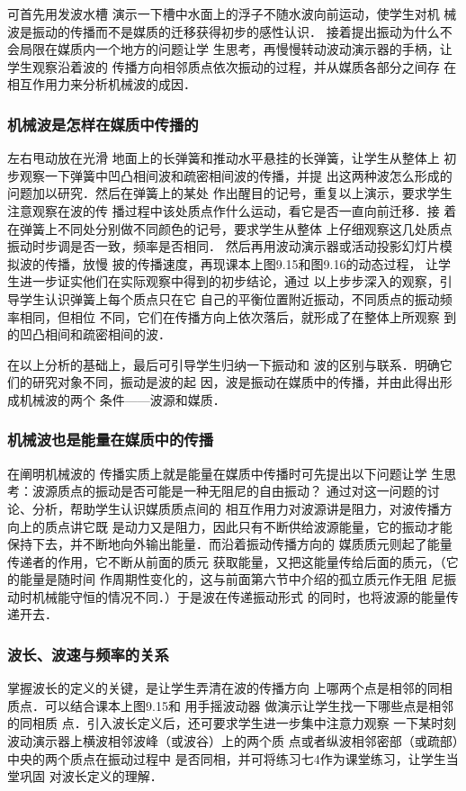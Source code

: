 可首先用发波水槽
演示一下槽中水面上的浮子不随水波向前运动，使学生对机
械波是振动的传播而不是媒质的迁移获得初步的感性认识．
接着提出振动为什么不会局限在媒质内一个地方的问题让学
生思考，再慢慢转动波动演示器的手柄，让学生观察沿着波的
传播方向相邻质点依次振动的过程，并从媒质各部分之间存
在相互作用力来分析机械波的成因．

\subsubsection{机械波是怎样在媒质中传播的}

左右甩动放在光滑
地面上的长弹簧和推动水平悬挂的长弹簧，让学生从整体上
初步观察一下弹簧中凹凸相间波和疏密相间波的传播，并提
出这两种波怎么形成的问题加以研究．然后在弹簧上的某处
作出醒目的记号，重复以上演示，要求学生注意观察在波的传
播过程中该处质点作什么运动，看它是否一直向前迁移．接
着在弹簧上不同处分别做不同颜色的记号，要求学生从整体
上仔细观察这几处质点振动时步调是否一致，频率是否相同．
然后再用波动演示器或活动投影幻灯片模拟波的传播，放慢
披的传播速度，再现课本上图9.15和图9.16的动态过程，
让学生进一步证实他们在实际观察中得到的初步结论，通过
以上步步深入的观察，引导学生认识弹簧上每个质点只在它
自己的平衡位置附近振动，不同质点的振动频率相同，但相位
不同，它们在传播方向上依次落后，就形成了在整体上所观察
到的凹凸相间和疏密相间的波．

在以上分析的基础上，最后可引导学生归纳一下振动和
波的区别与联系．明确它们的研究对象不同，振动是波的起
因，波是振动在媒质中的传播，并由此得出形成机械波的两个
条件——波源和媒质．

\subsubsection{机械波也是能量在媒质中的传播}

在阐明机械波的
传播实质上就是能量在媒质中传播时可先提出以下问题让学
生思考：波源质点的振动是否可能是一种无阻尼的自由振动？
通过对这一问题的讨论、分析，帮助学生认识媒质质点间的
相互作用力对波源讲是阻力，对波传播方向上的质点讲它既
是动力又是阻力，因此只有不断供给波源能量，它的振动才能
保持下去，并不断地向外输出能量．而沿着振动传播方向的
媒质质元则起了能量传递者的作用，它不断从前面的质元
获取能量，又把这能量传给后面的质元，（它的能量是随时间
作周期性变化的，这与前面第六节中介绍的孤立质元作无阻
尼振动时机械能守恒的情况不同．）于是波在传递振动形式
的同时，也将波源的能量传递开去．

\subsubsection{波长、波速与频率的关系}
掌握波长的定义的关键，是让学生弄清在波的传播方向
上哪两个点是相邻的同相质点．可以结合课本上图9.15和
用手摇波动器 做演示让学生找一下哪些点是相邻的同相质
点．引入波长定义后，还可要求学生进一步集中注意力观察
一下某时刻波动演示器上横波相邻波峰（或波谷）上的两个质
点或者纵波相邻密部（或疏部）中央的两个质点在振动过程中
是否同相，并可将练习七4作为课堂练习，让学生当堂巩固
对波长定义的理解．

